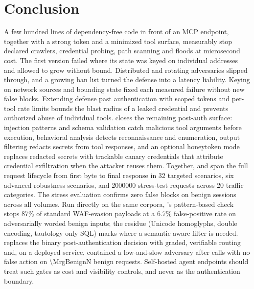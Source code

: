 \documentclass[10pt,twocolumn]{article}
\begin{document}
\section{Conclusion}
A few hundred lines of dependency-free code in front of an MCP endpoint,
together with a strong token and a minimized tool surface, measurably stop
declared crawlers, credential probing, path scanning and floods at
microsecond cost. The first version failed where its state was keyed on
individual addresses and allowed to grow without bound. Distributed and
rotating adversaries slipped through, and a growing ban list turned the
defense into a latency liability. Keying on network sources and bounding
state fixed each measured failure without new false blocks. Extending
defense past authentication with scoped tokens and per-tool rate limits
bounds the blast radius of a leaked credential and prevents authorized
abuse of individual tools. \bastion{} closes the remaining post-auth
surface: injection patterns and schema validation catch malicious tool
arguments before execution, behavioral analysis detects reconnaissance and
enumeration, output filtering redacts secrets from tool responses, and an
optional honeytoken mode replaces redacted secrets with trackable canary
credentials that attribute credential exfiltration when the attacker reuses
them. Together, \sys{} and \bastion{} span the full request lifecycle from
first byte to final response in 32 targeted scenarios, six advanced
robustness scenarios, and \num{2000000} stress-test requests across 20
traffic categories. The stress evaluation confirms zero false blocks on
benign sessions across all volumes. Run directly on the same corpora,
\bastion{}'s pattern-based check stops 87\% of standard WAF-evasion payloads
at a 6.7\% false-positive rate on adversarially worded benign inputs; the
residue (Unicode homoglyphs, double encoding, tautology-only SQL) marks where
a semantic-aware filter is needed. \mirage{} replaces the binary
post-authentication decision with graded, verifiable routing and, on a
deployed service, contained a low-and-slow adversary after \MrgSlowFirst{}
calls with no false action on \num{\MrgBenignN} benign requests. Self-hosted agent endpoints should treat such
gates as cost and visibility controls, and never as the authentication
boundary.
\end{document}

